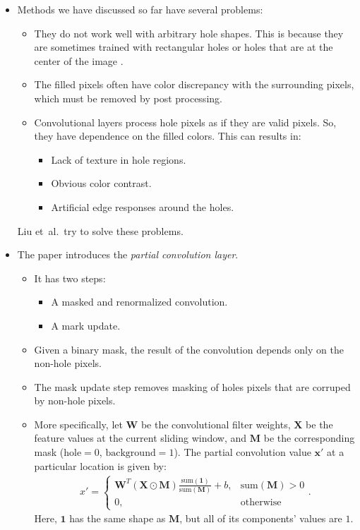 \documentclass[10pt]{article}
\newcommand{\ve}[1]{\mathbf{#1}}
\newcommand{\etal}{{et~al.}}
\begin{document}
  \begin{itemize}
    \item Methods we have discussed so far have several problems:
    \begin{itemize}
       \item They do not work well with arbitrary hole shapes. This is because they are sometimes trained with rectangular holes \cite{Pathak:2016} or holes that are at the center of the image \cite{Iizuka:2017, Yu:2018}.

       \item The filled pixels often have color discrepancy with the surrounding pixels, which must be removed by post processing.

       \item Convolutional layers process hole pixels as if they are valid pixels. So, they have dependence on the filled colors. This can results in:
       \begin{itemize}
         \item Lack of texture in hole regions.
         \item Obvious color contrast.
         \item Artificial edge responses around the holes.
       \end{itemize}
     \end{itemize}  Liu \etal\ try to solve these problems.

    \item The paper introduces the \emph{partial convolution layer}.
    \begin{itemize}
      \item It has two steps:
      \begin{itemize}
        \item A masked and renormalized convolution.
        \item A mark update.
      \end{itemize}
      \item Given a binary mask, the result of the convolution depends only on the non-hole pixels.      
      \item The mask update step removes masking of holes pixels that are corruped by non-hole pixels.

      \item More specifically, let $\ve{W}$ be the convolutional filter weights, $\ve{X}$ be the feature values at the current sliding window, and $\ve{M}$ be the corresponding mask ($\mathrm{hole} = 0$, $\mathrm{background} = 1$). The partial convolution value $\ve{x}'$ at a particular location is given by:
      \begin{align*}
        x' = \begin{cases}
          \ve{W}^T (\ve{X} \odot \ve{M}) \frac{\mathrm{sum}(\ve{1})}{\mathrm{sum}(\ve{M})} + b,
          & \mathrm{sum}(\ve{M}) > 0\\
          0, 
          & \mathrm{otherwise}
        \end{cases}.
      \end{align*}
      Here, $\ve{1}$ has the same shape as $\ve{M}$, but all of its components' values are $1$.


\end{itemize}
\end{itemize}
\end{document}
